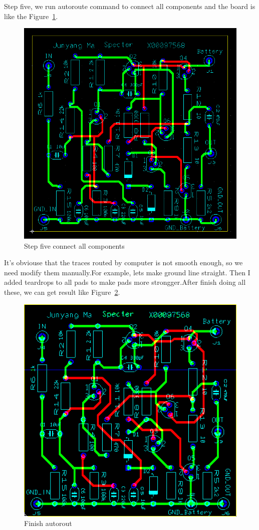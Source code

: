Step five, we run autoroute command to connect all components and the board is like the Figure~\ref{fig:Step five connect all components}.
\begin{figure}[htbp]
	\centering
	\includegraphics[scale=0.6]{"../Photo/Chap6/Step_five_run_autoroute"}
	\caption{Step five connect all components }
	\label{fig:Step five connect all components}
\end{figure}

It's obviouse that the traces routed by computer is not smooth enough, so we need modify them manually.For example, lets make ground line straight.
Then I added teardrops to all pads to make pads more strongger.After finish doing all these, we can get result like Figure~\ref{fig:Finsh autorout}.

\begin{figure}[htbp]
	\centering
	\includegraphics[scale=0.9]{"../Photo/Chap6/final PCB all"}
	\caption{Finish autorout }
	\label{fig:Finsh autorout}
\end{figure}

